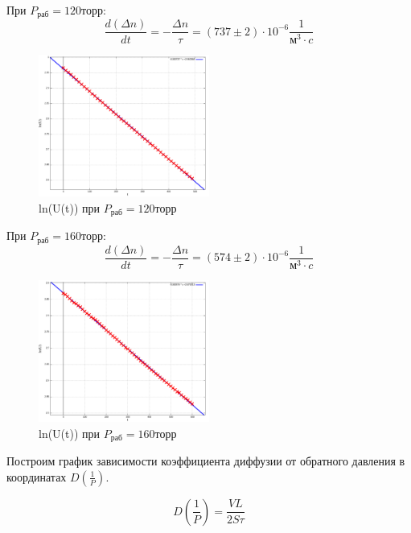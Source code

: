 \documentclass[11pt]{article}
\begin{document}
\begin{enumerate}
    \medskip
     
    При $P_{раб} = 120 торр$:
    \[\frac{d(\Delta n)}{dt} = - \frac{\Delta n}{ \tau} = (737 \pm 2) \cdot 10^{-6}\frac{1}{м^3 \cdot c}\]

    \begin{figure}[H]
    \centering
    \captionsetup{justification=centering}
    \includegraphics[width=0.5\textwidth]{3-log.res.png}
    \caption{ln(U(t)) при $P_{раб} = 120 торр$}
    \end{figure}

    \medskip
     
    При $P_{раб} = 160 торр$:
    \[\frac{d(\Delta n)}{dt} = - \frac{\Delta n}{ \tau} = ( 574\pm 2) \cdot 10^{-6}\frac{1}{м^3 \cdot c}\]

    \begin{figure}[H]
    \centering
    \captionsetup{justification=centering}
    \includegraphics[width=0.5\textwidth]{4-log.res.png}
    \caption{ln(U(t)) при $P_{раб} = 160 торр$}
    \end{figure}

    \medskip

     Построим график зависимости коэффициента диффузии от обратного давления в координатах $D(\frac{1}{P})$.

    \[ D(\frac{1}{P}) = \frac{VL}{2S\tau}\]


\end{enumerate}
\end{document}
